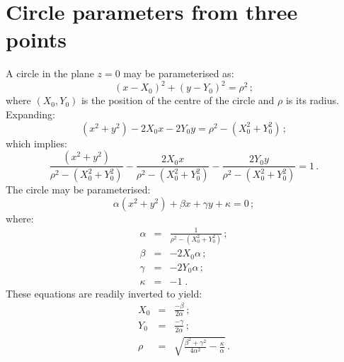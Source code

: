 \section{Circle parameters from three points}
\label{App:SciFiThreePointCircle}

A circle in the plane $z=0$ may be parameterised as:
\begin{equation}
  ( x - X_0 )^2 + ( y - Y_0 )^2 = \rho^2 \, ;
\end{equation}
where $(X_0, Y_0)$ is the position of the centre of the circle and $\rho$
is its radius.
Expanding:
\begin{equation}
  (x^2+y^2) - 2 X_0 x - 2 Y_0 y = \rho^2 -( X_0^2 + Y_0^2 ) \, ;
\end{equation}
which implies:
\begin{equation}
  \frac{(x^2+y^2)}{\rho^2 -( X_0^2 + Y_0^2 )} - 
  \frac{2 X_0 x}{\rho^2 -( X_0^2 + Y_0^2 )}   - 
  \frac{2 Y_0 y}{\rho^2 -( X_0^2 + Y_0^2 )} = 1 \, .
\end{equation}
The circle may be parameterised:
\begin{equation}
  \alpha(x^2+y^2) + \beta x + \gamma y + \kappa = 0 \, ;
  \label{Eq:CrclPrm}
\end{equation}
where:
\begin{eqnarray}
  \alpha & = & \frac{1}{\rho^2 - ( X_0^2 + Y_0^2 )}        \, ;          \\
  \beta  & = & -2 X_0 \alpha                           \, ;          \\
  \gamma & = & -2 Y_0 \alpha                           \, ;          \\
  \kappa & = & -1                                       \; .
\end{eqnarray}
These equations are readily inverted to yield:
\begin{eqnarray}
  X_0 & = & \frac{-\beta}{2 \alpha}                    \, ;
  \label{Eq:Param1}                                                  \\
  Y_0 & = & \frac{-\gamma}{2 \alpha}                   \, ; 
  \label{Eq:Param2}                                                  \\
  \rho   & = & \sqrt{
                  \frac{\beta^2 + \gamma^2}{4 \alpha^2}
                  - \frac{\kappa}{\alpha}
                  } \, .
  \label{Eq:Param3}
\end{eqnarray}


